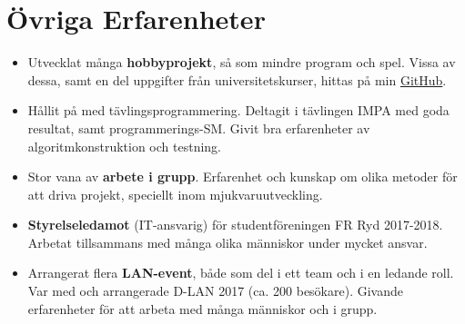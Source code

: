 \documentclass[12pt]{article}
\newcommand{\text}[2]{#2}
\newcommand{\text}[2]{#1}
\begin{document}
\section*{\text{Other Experiences}{Övriga Erfarenheter}}
\begin{itemize}
    \item \text{
            Developed multiple \textbf{hobby projects} such as smaller programs and video games. Some of these, as well as some university assignments, can be found on my \href{http://github.com/joeloskarsson}{GitHub}.
        }{
            Utvecklat många \textbf{hobbyprojekt}, så som mindre program och spel. Vissa av dessa, samt en del uppgifter från universitetskurser, hittas på min \href{http://github.com/joeloskarsson}{GitHub}.
        }

    \item \text{
            Experience with \textbf{competitive programming}. I have competed in the IMPA competition with good results and also taken part in the Nordic Collegiate Programming Contest. This has given me good training in algorithm construction and testing.
        }{
            Hållit på med tävlingsprogrammering. Deltagit i tävlingen IMPA med goda resultat, samt programmerings-SM. Givit bra erfarenheter av algoritmkonstruktion och testning.
        }

    \item \text{
            Plenty of experience \textbf{working in groups}. Good team player with experience and knowledge of different methodologies for software development.
        }{
            Stor vana av \textbf{arbete i grupp}. Erfarenhet och kunskap om olika metoder för att driva projekt, speciellt inom mjukvaruutveckling.
        }

    \item \text{
            \textbf{Board member} (IT Manager) of student association FR Ryd 2017-2018. Working with many different people and under a lot of responsibility.
        }{
            \textbf{Styrelseledamot} (IT-ansvarig) för studentföreningen FR Ryd 2017-2018. Arbetat tillsammans med många olika människor under mycket ansvar.
        }

    \item \text{
            Organized multiple \textbf{LAN-parties}, both as a member of a team and in a leading role. Part of the organizing team for D-LAN 2017 (around 200 visitors). Resulted in improved people skills and teamwork.
        }{
            Arrangerat flera \textbf{LAN-event}, både som del i ett team och i en ledande roll. Var med och arrangerade D-LAN 2017 (ca. 200 besökare). Givande erfarenheter för att arbeta med många människor och i grupp.
        }

\end{itemize}
\end{document}
